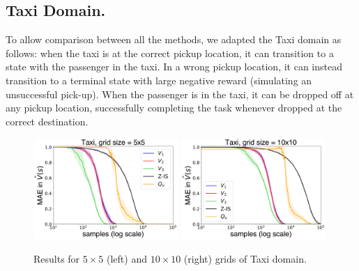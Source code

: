 



\subsection{Taxi Domain.}
To allow comparison between all the methods, we adapted the Taxi domain as follows: when the taxi is at the correct pickup location, it can transition to a state with the passenger in the taxi.
In a wrong pickup location, it can instead transition to a terminal state with large negative reward (simulating an unsuccessful pick-up).
When the passenger is in the taxi, it can be dropped off at any pickup location, successfully completing the task whenever dropped at the correct destination.

\begin{figure}[!h]
\centering
\includegraphics[width=0.49\textwidth]{figures/chapter1/taxi_5.png}
\includegraphics[width=0.49\textwidth]{figures/chapter1/taxi_10.png}
\caption{Results for $5 \times 5$ (left) and $10 \times 10$ (right) grids of Taxi domain.}
\label{fig:hlmdps_errors_taxi}
\end{figure}

